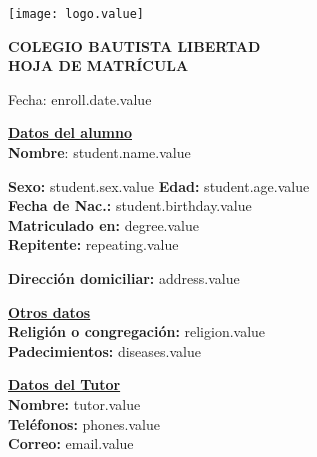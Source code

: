 \documentclass[12pt]{article}
\newcommand{\aField}[1]{#1}
\newcommand{\enrollDate}{enroll.date.value}
\newcommand{\studentName}{student.name.value}
\newcommand{\studentBirthday}{student.birthday.value}
\newcommand{\studentAge}{student.age.value}
\newcommand{\studentSex}{student.sex.value}
\newcommand{\isRepeating}{repeating.value}
\newcommand{\degree}{degree.value}
\newcommand{\address}{address.value}
\newcommand{\religion}{religion.value}
\newcommand{\diseases}{diseases.value}
\newcommand{\tutor}{tutor.value}
\newcommand{\phones}{phones.value}
\newcommand{\email}{email.value}
\begin{document}
    \begin{minipage}[c][2.5cm]{0.2\textwidth}
        \texttt{[image: logo.value]}
    \end{minipage}
    \begin{minipage}[c][2.5cm]{0.6\textwidth}
        \begin{center}
            \textbf{\large COLEGIO BAUTISTA LIBERTAD\\HOJA DE MATRÍCULA}
        \end{center}
    \end{minipage}
    
    \hfill Fecha: \enrollDate
    
    \textbf{\uline{Datos del alumno}}\\
    \textbf{Nombre}: \aField{\studentName}
    \par\vspace{1mm}
    \begin{minipage}[t]{0.48\textwidth}
        \textbf{Sexo:} \aField{\studentSex}\hspace{7mm} \textbf{Edad:} \aField{\studentAge}\\
        \textbf{Fecha de Nac.:} \aField{\studentBirthday}\\
        \textbf{Matriculado en:} \aField{\degree}\\
        \textbf{Repitente:} \aField{\isRepeating}
    \end{minipage}
    \hfill
    \begin{minipage}[t]{0.48\textwidth}
        \textbf{Dirección domiciliar:} \aField{\address}
    \end{minipage}
    \par\vspace{4mm}
    \begin{minipage}[t]{0.48\textwidth}
        \textbf{\uline{Otros datos}}\\
        \textbf{Religión o congregación:} \aField{\religion}\\
        \textbf{Padecimientos:} \aField{\diseases}
    \end{minipage}
    \hfill
    \begin{minipage}[t]{0.48\textwidth}
        \textbf{\uline{Datos del Tutor}}\\
        \textbf{Nombre:} \aField{\tutor}\\
        \textbf{Teléfonos:} \aField{\phones}\\
        \textbf{Correo:} \aField{\email}
    \end{minipage}
\end{document}
